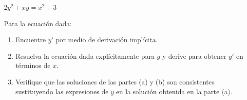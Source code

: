 \setcounter{enumi}{4}
\item $2y^2 + xy = x^2 + 3$
\par
Para la ecuación dada:
\begin{enumerate}
    \item[(a)] Encuentre $y'$ por medio de derivación implícita.
    \item[(b)] Resuelva la ecuación dada explícitamente para $y$ y derive para obtener $y'$ en términos de $x$.
    \item[(c)] Verifique que las soluciones de las partes (a) y (b) son consistentes sustituyendo las expresiones de $y$ en la solución obtenida en la parte (a).
\end{enumerate}
